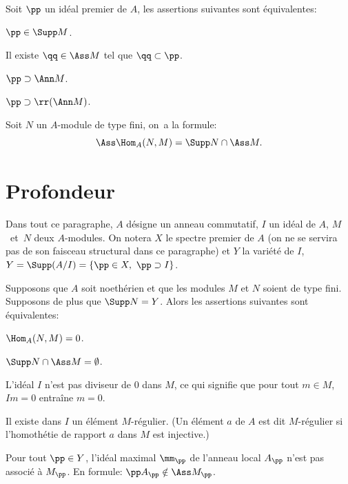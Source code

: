 \begin{proposition} \label{III.1.2}
Soit $\pp $ un id\'eal premier de $A$, les assertions suivantes sont \'equivalentes:
\begin{enumeratei}
\item
$\pp \in \Supp M$.

\item
Il existe $\qq \in \Ass M$ tel que $\qq \subset\pp $.

\item
$\pp \supset \Ann M$.

\item[\textup{(iii bis)}]
$\pp \supset \rr(\Ann M)$.
\end{enumeratei}
\end{proposition}

\begin{proposition} \label{III.1.3}
Soit $N$ un $A$-module de type fini, on~a la formule:
\[
\Ass \Hom_A(N, M) = \Supp N \cap \Ass M.
\]
\end{proposition}

\section{Profondeur} \label{III.2}

Dans tout ce paragraphe, $A$ d\'esigne un anneau commutatif, $I$ un id\'eal de $A$, $M$~et~$N$ deux $A$-modules. On notera $X$ le spectre premier de $A$ (on ne se servira pas de son faisceau structural dans ce paragraphe) et $Y$ la vari\'et\'e de $I$, $Y = \Supp(A/I) = \{\pp \in X, \ \pp \supset I\}$.

\begin{lemme} \label{III.2.1}
Supposons que $A$ soit noeth\'erien et que les modules $M$ et $N$ soient de type fini. Supposons de plus que $\Supp N=Y$. Alors les assertions suivantes sont \'equivalentes:
\begin{enumeratei}
\item
$\Hom_A(N, M)=0$.
\item
$\Supp N \cap \Ass M = \emptyset$.
\item
L'id\'eal $I$ n'est pas diviseur de $0$ dans $M$, ce qui signifie que pour tout $m\in M$, $Im=0$ entra\^ine $m=0$.
\item
Il existe dans $I$ un \'el\'ement $M$-r\'egulier. (Un \'el\'ement $a$ de $A$ est dit $M$-r\'egulier si l'homoth\'etie de rapport $a$ dans $M$ est injective.)

\item
Pour tout $\pp \in Y$, l'id\'eal maximal $\mm_\pp$ de l'anneau local $A_\pp$ n'est pas associ\'e \`a $M_\pp$. En formule: $\pp A_\pp \notin \Ass M_\pp$.
\end{enumeratei}
\end{lemme}

